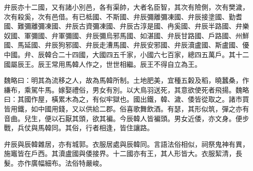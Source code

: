 
\begin{pinyinscope}
弁辰亦十二國，又有諸小別邑，各有渠帥，大者名臣智，其次有險側，次有樊濊，次有殺奚，次有邑借。有已柢國、不斯國、弁辰彌離彌凍國、弁辰接塗國、勤耆國、難彌離彌凍國、弁辰古資彌凍國、弁辰古淳是國、冉奚國、弁辰半路國、弁樂奴國、軍彌國、弁軍彌國、弁辰彌烏邪馬國、如湛國、弁辰甘路國、戶路國、州鮮國、馬延國、弁辰狗邪國、弁辰走漕馬國、弁辰安邪國、弁辰瀆盧國、斯盧國、優中國。弁、辰韓合二十四國，大國四五千家，小國六七百家，總四五萬戶。其十二國屬辰王。辰王常用馬韓人作之，世世相繼。辰王不得自立為王。

魏略曰：明其為流移之人，故為馬韓所制。土地肥美，宜種五糓及稻，曉蠶桑，作縑布，乘駕牛馬。嫁娶禮俗，男女有別。以大鳥羽送死，其意欲使死者飛揚。魏略曰：其國作屋，橫累木為之，有似牢獄也。國出鐵，韓、濊、倭皆從取之。諸巿買皆用鐵，如中國用錢，又以供給二郡。俗喜歌舞飲酒。有瑟，其形似筑，彈之亦有音曲。兒生，便以石厭其頭，欲其褊。今辰韓人皆褊頭。男女近倭，亦文身。便步戰，兵仗與馬韓同。其俗，行者相逢，皆住讓路。

弁辰與辰韓雜居，亦有城郭。衣服居處與辰韓同。言語法俗相似，祠祭鬼神有異，施竈皆在戶西。其瀆盧國與倭接界。十二國亦有王，其人形皆大。衣服絜清，長髮。亦作廣幅細布。法俗特嚴峻。


\end{pinyinscope}